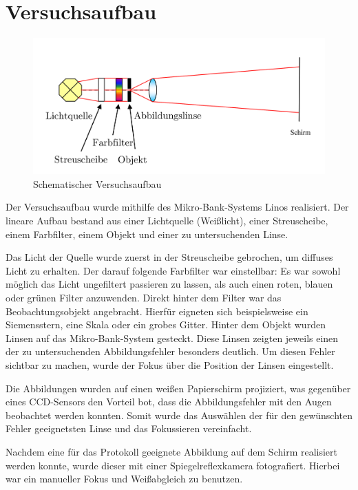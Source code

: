 \section{Versuchsaufbau}

\begin{figure}[h!]
	\includegraphics[width=\linewidth]{img/versuchsaufbau.png}
	\caption{Schematischer Versuchsaufbau}
	\label{fig:versuchsaufbau}
\end{figure}

Der Versuchsaufbau wurde mithilfe des Mikro-Bank-Systems Linos realisiert. Der lineare Aufbau bestand aus einer Lichtquelle (Weißlicht), einer Streuscheibe, einem Farbfilter, einem Objekt und einer zu untersuchenden Linse. 

Das Licht der Quelle wurde zuerst in der Streuscheibe gebrochen, um diffuses Licht zu erhalten. Der darauf folgende Farbfilter war einstellbar: Es war sowohl möglich das Licht ungefiltert passieren zu lassen, als auch einen roten, blauen oder grünen Filter anzuwenden. Direkt hinter dem Filter war das Beobachtungsobjekt angebracht. Hierfür eigneten sich beispielsweise ein Siemensstern, eine Skala oder ein grobes Gitter. Hinter dem Objekt wurden Linsen auf das Mikro-Bank-System gesteckt. Diese Linsen zeigten jeweils einen der zu untersuchenden Abbildungsfehler besonders deutlich. Um diesen Fehler sichtbar zu machen, wurde der Fokus über die Position der Linsen eingestellt. 

Die Abbildungen wurden auf einen weißen Papierschirm projiziert, was gegenüber eines CCD-Sensors den Vorteil bot, dass die Abbildungsfehler mit den Augen beobachtet werden konnten. Somit wurde das Auswählen der für den gewünschten Fehler geeignetsten Linse und das Fokussieren vereinfacht.

Nachdem eine für das Protokoll geeignete Abbildung auf dem Schirm realisiert werden konnte, wurde dieser mit einer Spiegelreflexkamera fotografiert. Hierbei war ein manueller Fokus und Weißabgleich zu benutzen.

